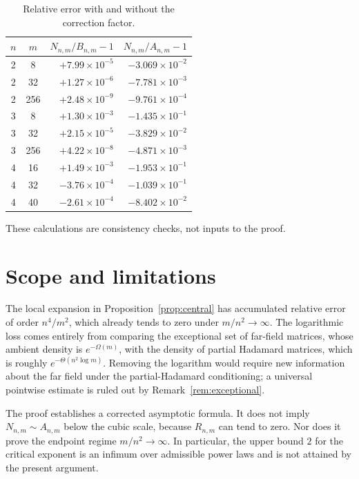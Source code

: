 \documentclass[11pt,reqno]{amsart}
\theoremstyle{plain}
\theoremstyle{definition}
\theoremstyle{remark}
\begin{document}
\begin{table}[ht]
\caption{Relative error with and without the correction factor.}
\begin{tabular}{ccrr}
\toprule
\(n\) & \(m\) & \(N_{n,m}/B_{n,m}-1\) & \(N_{n,m}/A_{n,m}-1\)\\
\midrule
2 & 8   & \(+7.99\times10^{-5}\) & \(-3.069\times10^{-2}\)\\
2 & 32  & \(+1.27\times10^{-6}\) & \(-7.781\times10^{-3}\)\\
2 & 256 & \(+2.48\times10^{-9}\) & \(-9.761\times10^{-4}\)\\
3 & 8   & \(+1.30\times10^{-3}\) & \(-1.435\times10^{-1}\)\\
3 & 32  & \(+2.15\times10^{-5}\) & \(-3.829\times10^{-2}\)\\
3 & 256 & \(+4.22\times10^{-8}\) & \(-4.871\times10^{-3}\)\\
4 & 16  & \(+1.49\times10^{-3}\) & \(-1.953\times10^{-1}\)\\
4 & 32  & \(-3.76\times10^{-4}\) & \(-1.039\times10^{-1}\)\\
4 & 40  & \(-2.61\times10^{-4}\) & \(-8.402\times10^{-2}\)\\
\bottomrule
\end{tabular}
\end{table}

These calculations are consistency checks, not inputs to the proof.

\section{Scope and limitations}\label{sec:limits}

The local expansion in Proposition~\ref{prop:central} has accumulated relative
error of order \(n^4/m^2\), which already tends to zero under
\(m/n^2\to\infty\). The logarithmic loss comes entirely from comparing the
exceptional set of far-field matrices, whose ambient density is
\(e^{-\Omega(m)}\), with the density of partial Hadamard matrices, which is
roughly \(e^{-\Theta(n^2\log m)}\). Removing the logarithm would require new
information about the far field under the partial-Hadamard conditioning; a
universal pointwise estimate is ruled out by Remark~\ref{rem:exceptional}.

The proof establishes a corrected asymptotic formula. It does not imply
\(N_{n,m}\sim A_{n,m}\) below the cubic scale, because \(R_{n,m}\) can tend to
zero. Nor does it prove the endpoint regime \(m/n^2\to\infty\). In particular,
the upper bound \(2\) for the critical exponent is an infimum over admissible
power laws and is not attained by the present argument.
\end{document}
